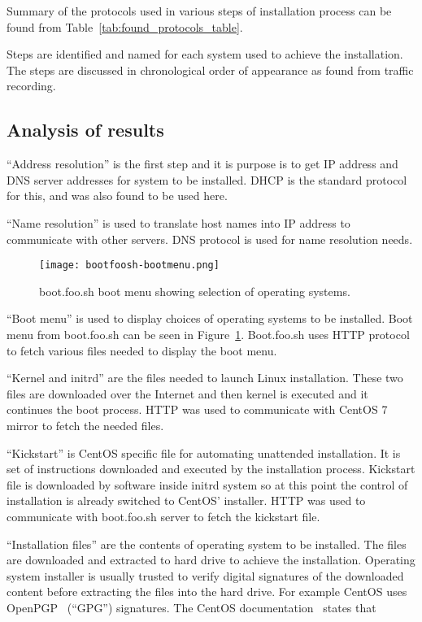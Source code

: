 Summary of the protocols used in various steps of installation process
can be found from Table~\ref{tab:found_protocols_table}.

Steps are identified and named for each system used to achieve the
installation. The steps are discussed in chronological order of
appearance as found from traffic recording.

\subsection{Analysis of results}

``Address resolution'' is the first step and it is purpose is to get IP
address and DNS server addresses for system to be installed. DHCP is
the standard protocol for this, and was also found to be used here.

``Name resolution'' is used to translate host names into IP address to
communicate with other servers. DNS protocol is used for name
resolution needs.

\begin{figure}[h]
  \caption{boot.foo.sh boot menu showing selection of operating
    systems.\label{fig:bootmenu}}
  \texttt{[image: bootfoosh-bootmenu.png]}
\end{figure}

``Boot menu'' is used to display choices of operating systems to be
installed. Boot menu from boot.foo.sh can be seen in
Figure~\ref{fig:bootmenu}. Boot.foo.sh uses HTTP protocol to fetch
various files needed to display the boot menu.

``Kernel and initrd'' are the files needed to launch Linux
installation. These two files are downloaded over the Internet and
then kernel is executed and it continues the boot process. HTTP was
used to communicate with CentOS 7 mirror to fetch the needed files.

``Kickstart'' is CentOS specific file for automating unattended
installation. It is set of instructions downloaded and executed by the
installation process. Kickstart file is downloaded by software inside
initrd system so at this point the control of installation is already
switched to CentOS' installer. HTTP was used to communicate with
boot.foo.sh server to fetch the kickstart file.

``Installation files'' are the contents of operating system to be
installed. The files are downloaded and extracted to hard drive to
achieve the installation. Operating system installer is usually
trusted to verify digital signatures of the downloaded content before
extracting the files into the hard drive. For example CentOS uses
OpenPGP~\cite{RFC4880} (``GPG'') signatures. The CentOS
documentation~\cite{centos-gpg} states that


